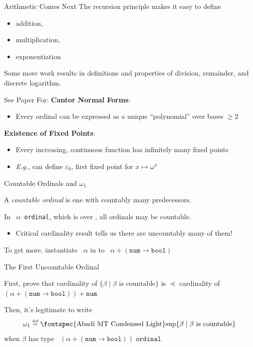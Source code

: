 \documentclass[xetex,14pt]{beamer}
\newcommand{\const}[1]{\mbox{\fontspec{Abadi MT Condensed Light}#1}}
\newcommand{\ty}[1]{\texttt{\color{MyPurple} #1}}
\begin{document}
\begin{frame}{Arithmetic Comes Next}
The recursion principle makes it easy to define
\begin{itemize}
\item addition,
\item multiplication,
\item exponentiation
\end{itemize}

\bigskip
Some more work results in definitions and properties of division, remainder, and discrete logarithm.

\end{frame}

\begin{frame}{See Paper For:}
\textbf{Cantor Normal Forms}:
\begin{itemize}
\item Every ordinal can be expressed as a unique “polynomial” over bases $\geq 2$
\end{itemize}

\bigskip\bigskip{}
\textbf{Existence of Fixed Points}:
\begin{itemize}
\item Every increasing, continuous function has infinitely many fixed points
\item \emph{E.g.}, can define $\varepsilon_0$, first fixed point for $x \mapsto \omega^x$
\end{itemize}

\end{frame}

\begin{frame}{Countable Ordinals and $\omega_1$}

A \emph{countable ordinal} is one with countably many predecessors.

\bigskip
In \ty{$\alpha$~ordinal}, which is over \ainf, all ordinals may be countable.
\begin{itemize}
\item Critical cardinality result tells us there are uncountably many of them!
\end{itemize}

\bigskip
To get more, instantiate \ty{$\alpha$} in \ainf{} to \ty{$\alpha + (\texttt{num}\to\texttt{bool})$}

\end{frame}

\begin{frame}{The First Uncountable Ordinal}


First, prove that cardinality of $\{\beta \mid \beta\mbox{ is countable}\}$ is $\preceq$
cardinality of \ty{$(\alpha + (\texttt{num} \to \texttt{bool})) + \texttt{num}$}

\bigskip
Then, it’s legitimate to write
\[
\omega_1 \stackrel{\mbox{\tiny def}}{=} \const{sup}\{\beta \mid \beta \mbox{ is countable}\}
\]
when $\beta$ has type \ty{$(\alpha + (\texttt{num}\to\texttt{bool}))\;\texttt{ordinal}$}

\end{frame}
\end{document}
